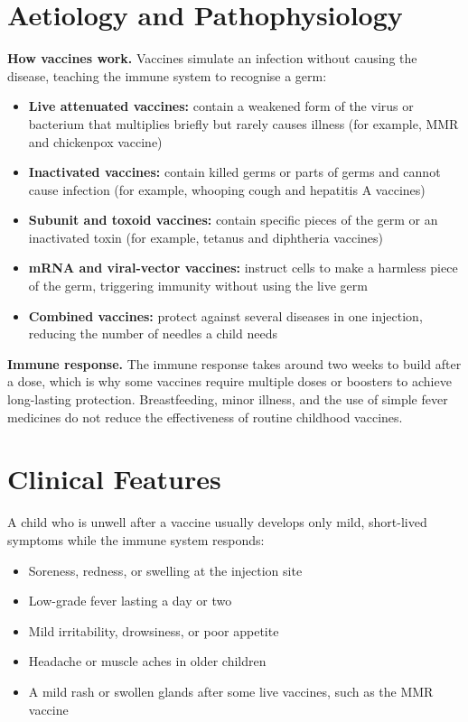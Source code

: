\section*{Aetiology and Pathophysiology}
\medskip
\textbf{How vaccines work.} Vaccines simulate an infection without causing the disease, teaching the immune system to recognise a germ:
\begin{itemize}
    \item \textbf{Live attenuated vaccines:} contain a weakened form of the virus or bacterium that multiplies briefly but rarely causes illness (for example, MMR and chickenpox vaccine)
    \item \textbf{Inactivated vaccines:} contain killed germs or parts of germs and cannot cause infection (for example, whooping cough and hepatitis A vaccines)
    \item \textbf{Subunit and toxoid vaccines:} contain specific pieces of the germ or an inactivated toxin (for example, tetanus and diphtheria vaccines)
    \item \textbf{mRNA and viral-vector vaccines:} instruct cells to make a harmless piece of the germ, triggering immunity without using the live germ
    \item \textbf{Combined vaccines:} protect against several diseases in one injection, reducing the number of needles a child needs
\end{itemize}

\medskip
\textbf{Immune response.} The immune response takes around two weeks to build after a dose, which is why some vaccines require multiple doses or boosters to achieve long-lasting protection. Breastfeeding, minor illness, and the use of simple fever medicines do not reduce the effectiveness of routine childhood vaccines.

\section*{Clinical Features}
A child who is unwell after a vaccine usually develops only mild, short-lived symptoms while the immune system responds:
\begin{itemize}
    \item Soreness, redness, or swelling at the injection site
    \item Low-grade fever lasting a day or two
    \item Mild irritability, drowsiness, or poor appetite
    \item Headache or muscle aches in older children
    \item A mild rash or swollen glands after some live vaccines, such as the MMR vaccine
\end{itemize}

